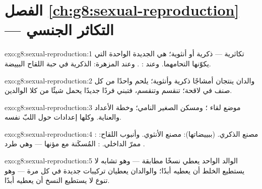 \section*{الفصل \ref{ch:g8:sexual-reproduction} --- التكاثر الجنسي}

\begin{solution}{exo:g8:sexual-reproduction:1}
  تكاثرية --- ذكرية أو أنثوية؛  هي 
الجديدة الواحدة التي يكوّنها التحامهما. وعند : 
. وعند  المزهرة:  الذكرية في حبة اللقاح
 البييضة.
\end{solution}

\begin{solution}{exo:g8:sexual-reproduction:2}
والدان ينتجان أمشاجًا ذكرية وأنثوية؛  يلحم واحدًا من كل
صنف في لاقحة؛  تنقسم وتنقسم، فتبني فردًا جديدًا يحمل شيئًا
من كلا الوالدين.
\end{solution}

\begin{solution}{exo:g8:sexual-reproduction:3}
موضع لقاء ؛ ومسكن الصغير النامي؛ وخطة الأعداد والعناية.
وكلها إعدادات حول اللبّ نفسه.
\end{solution}

\begin{solution}{exo:g8:sexual-reproduction:4}
: مصنع  الذكري.  (ببييضاتها): مصنع الأنثوي.
وأنبوب اللقاح: ممرّ  الداخلي. :  المُسكَنة مع
مؤنها --- وهي طرد  .
\end{solution}

\begin{solution}{exo:g8:sexual-reproduction:5}
الوالد الواحد يعطي نسخًا مطابقة --- وهو تشابه لا يستطيع الخلط أن
يعطيه أبدًا؛ والوالدان يعطيان تركيبات جديدة في كل مرة --- وهو تنوع
لا يستطيع النسخ أن يعطيه أبدًا.
\end{solution}

